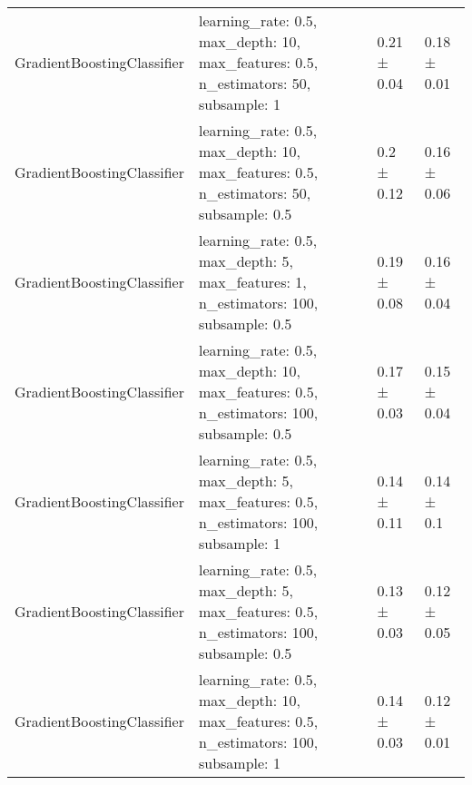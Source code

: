 \begin{tabular}{llll}
    GradientBoostingClassifier & learning\_rate: 0.5, max\_depth: 10, max\_features: 0.5, n\_estimators: 50, subsample: 1    & 0.21 ± 0.04    & 0.18 ± 0.01         \\
    GradientBoostingClassifier & learning\_rate: 0.5, max\_depth: 10, max\_features: 0.5, n\_estimators: 50, subsample: 0.5  & 0.2 ± 0.12     & 0.16 ± 0.06         \\
    GradientBoostingClassifier & learning\_rate: 0.5, max\_depth: 5, max\_features: 1, n\_estimators: 100, subsample: 0.5    & 0.19 ± 0.08    & 0.16 ± 0.04         \\
    GradientBoostingClassifier & learning\_rate: 0.5, max\_depth: 10, max\_features: 0.5, n\_estimators: 100, subsample: 0.5 & 0.17 ± 0.03    & 0.15 ± 0.04         \\
    GradientBoostingClassifier & learning\_rate: 0.5, max\_depth: 5, max\_features: 0.5, n\_estimators: 100, subsample: 1    & 0.14 ± 0.11    & 0.14 ± 0.1          \\
    GradientBoostingClassifier & learning\_rate: 0.5, max\_depth: 5, max\_features: 0.5, n\_estimators: 100, subsample: 0.5  & 0.13 ± 0.03    & 0.12 ± 0.05         \\
    GradientBoostingClassifier & learning\_rate: 0.5, max\_depth: 10, max\_features: 0.5, n\_estimators: 100, subsample: 1   & 0.14 ± 0.03    & 0.12 ± 0.01         \\
    \bottomrule
\end{tabular}
